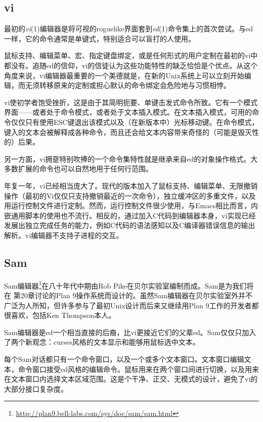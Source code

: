 \documentclass[12pt,oneside]{book}
\begin{document}
\subsection{vi}
最初的\textit{vi}(1)编辑器是将可视的roguelike界面套到\textit{ed}(1)命令集上的首次尝试。与ed一样，它的命令通常是单键式，特别适合可以盲打的人使用。

鼠标支持、编辑菜单、宏、指定键盘绑定，或是任何形式的用户定制在最初的vi中都没有。追随ed的信仰，vi的信徒认为这些功能特性的缺乏恰恰是个优点。从这个角度来说，vi编辑器最重要的一个美德就是，在新的Unix系统上可以立刻开始编辑，而无须转移原来的定制或担心默认的命令绑定会危险地与习惯相悖。

vi使初学者饱受挫折，这是由于其简明扼要、单键击发式命令所致。它有一个模式界面——或者处于命令模式，或者处于文本插入模式。在文本插入模式，可用的命令仅仅只有使用ESC键退出该模式以及（在新版本中）光标移动键。在命令模式，键入的文本会被解释成各种命令，而且还会给文本内容带来奇怪的（可能是毁灭性的）后果。

另一方面，vi拥趸特别吹捧的一个命令集特性就是继承来自ed的对象操作格式。大多数扩展的命令也可以自然地用于任何行范围。

年复一年，vi已经相当庞大了。现代的版本加入了鼠标支持、编辑菜单、无限撤销操作（最初的Vi仅仅只支持撤销最近的一次命令），独立缓冲区的多重文件，以及用运行控制文件进行定制。然而，运行控制文件很少使用，与Emacs相比而言，内嵌通用脚本的使用也不流行。相反的，通过加入C代码到编辑器本身，vi实现已经发展出独立完成任务的能力，例如C代码的语法感知以及C编译器错误信息的输出解析。vi编辑器不支持子进程的交互。

\subsection{Sam}
Sam编辑器\footnote{\href{http://plan9.bell-labs.com/sys/doc/sam/sam.html}{http://plan9.bell-labs.com/sys/doc/sam/sam.html}}在八十年代中期由Rob Pike在贝尔实验室编制而成。Sam是为我们将在
第20章讨论的Plan 9操作系统而设计的。虽然Sam编辑器在贝尔实验室外并不广泛为人所知，但许多参与了最初Unix设计而后来又继续用Plan 9工作的开发者都很喜欢，包括Ken Thompson本人。

Sam编辑器是ed一个相当直接的后裔，比vi更接近它们的父辈ed。Sam仅仅只加入了两个新观念：curses风格的文本显示和能够用鼠标选中文本。

每个Sam对话都只有一个命令窗口，以及一个或多个文本窗口。文本窗口编辑文本，命令窗口接受ed风格的编辑命令。鼠标用来在两个窗口间进行切换，以及用来在文本窗口内选择文本区域范围。这是个干净、正交、无模式的设计，避免了vi的大部分接口复杂度。
\end{document}
